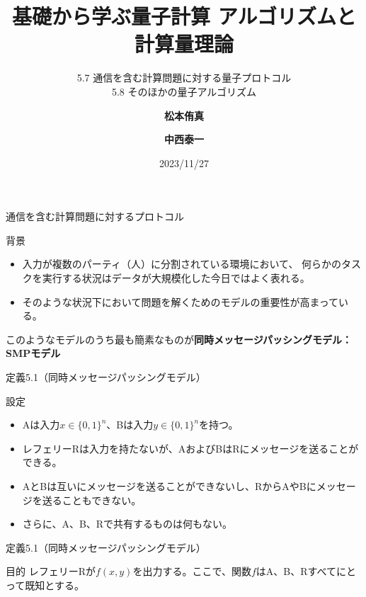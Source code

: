 \documentclass[14pt,aspectratio=169,xcolor=dvipsnames,table,dvipdfmx]{beamer}
\title{基礎から学ぶ量子計算 アルゴリズムと計算量理論}
\subtitle{5.7 通信を含む計算問題に対する量子プロトコル \\
          5.8 そのほかの量子アルゴリズム}
\author{\textbf{松本侑真}\and \textbf{中西泰一}}
\date{2023/11/27}
\theoremstyle{definition}
\begin{document}
\maketitle

\begin{frame}{通信を含む計算問題に対するプロトコル}
  \begin{exampleblock}{背景}
    \begin{itemize}
      \item 入力が複数のパーティ（人）に分割されている環境において、
            何らかのタスクを実行する状況はデータが大規模化した今日ではよく表れる。
      \item そのような状況下において問題を解くためのモデルの重要性が高まっている。
    \end{itemize}
  \end{exampleblock}
  このようなモデルのうち最も簡素なものが\textbf{同時メッセージパッシングモデル：SMPモデル}
\end{frame}

\begin{frame}{定義5.1（同時メッセージパッシングモデル）}
  \begin{block}{設定}
    \begin{itemize}
      \item Aは入力$x\in\{0,1\}^n$、Bは入力$y\in\{0,1\}^n$を持つ。
      \item レフェリーRは入力を持たないが、AおよびBはRにメッセージを送ることができる。
      \item AとBは互いにメッセージを送ることができないし、RからAやBにメッセージを送ることもできない。
      \item さらに、A、B、Rで共有するものは何もない。
    \end{itemize}
  \end{block}
\end{frame}

\begin{frame}{定義5.1（同時メッセージパッシングモデル）}
  \begin{center}
  \end{center}
  \begin{block}{目的}
    レフェリーRが$f(x,y)$を出力する。ここで、関数$f$はA、B、Rすべてにとって既知とする。
  \end{block}
\end{frame}
\end{document}
